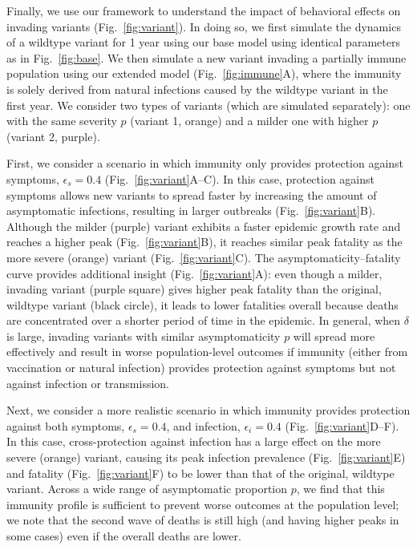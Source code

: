 \documentclass[12pt]{article}
\newcommand{\fref}[1]{Fig.~\ref{fig:#1}}
\begin{document}
Finally, we use our framework to understand the impact of behavioral effects on invading variants (\fref{variant}).
In doing so, we first simulate the dynamics of a wildtype variant for 1 year using our base model using identical parameters as in \fref{base}.
We then simulate a new variant invading a partially immune population using our extended model (\fref{immune}A), where the immunity is solely derived from natural infections caused by the wildtype variant in the first year.
We consider two types of variants (which are simulated separately): one with the same severity $p$ (variant 1, orange) and a milder one with higher $p$ (variant 2, purple).

First, we consider a scenario in which immunity only provides protection against symptoms, $\epsilon_s = 0.4$ (\fref{variant}A--C).
In this case, protection against symptoms allows new variants to spread faster by increasing the amount of asymptomatic infections, resulting in larger outbreaks (\fref{variant}B).
Although the milder (purple) variant exhibits a faster epidemic growth rate and reaches a higher peak (\fref{variant}B), it reaches similar peak fatality as the more severe (orange) variant (\fref{variant}C).
The asymptomaticity--fatality curve provides additional insight (\fref{variant}A): even though a milder, invading variant (purple square) gives higher peak fatality than the original, wildtype variant (black circle), it leads to lower fatalities overall because deaths are concentrated over a shorter period of time in the epidemic.
In general, when $\delta$ is large, invading variants with similar asymptomaticity $p$ will spread more effectively and result in worse population-level outcomes if immunity (either from vaccination or natural infection) provides protection against symptoms but not against infection or transmission.

Next, we consider a more realistic scenario in which immunity provides protection against both symptoms, $\epsilon_s = 0.4$, and infection, $\epsilon_i = 0.4$ (\fref{variant}D--F).
In this case, cross-protection against infection has a large effect on the more severe (orange) variant, causing its peak infection prevalence (\fref{variant}E) and fatality (\fref{variant}F) to be lower than that of the original, wildtype variant.
Across a wide range of asymptomatic proportion $p$, we find that this immunity profile is sufficient to prevent worse outcomes at the population level;
we note that the second wave of deaths is still high (and having higher peaks in some cases) even if the overall deaths are lower.
\end{document}
